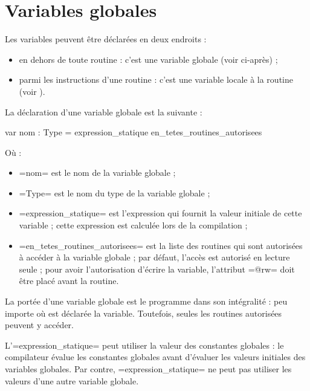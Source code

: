 




\chapter{Variables globales}

Les variables peuvent être déclarées en deux endroits :
\begin{itemize}
  \item en dehors de toute routine : c'est une variable globale (voir ci-après) ;
  \item parmi les instructions d'une routine : c'est une variable locale à la routine (voir ).
\end{itemize}






La déclaration d'une variable globale est la suivante :

\begin{PLM}
var nom : Type = expression_statique {
  en_tetes_routines_autorisees
}
\end{PLM}

Où :
\begin{itemize}
  \item \plm=nom= est le nom de la variable globale ;
  \item \plm=Type= est le nom du type de la variable globale ;
  \item \plm=expression_statique= est l'expression qui fournit la valeur initiale de cette variable ; cette expression est calculée lors de la compilation ;
  \item \plm=en_tetes_routines_autorisees= est la liste des routines qui sont autorisées à accéder à la variable globale ; par défaut, l'accès est autorisé en lecture seule ; pour avoir l'autorisation d'écrire la variable, l'attribut \plm=@rw= doit être placé avant la routine.
\end{itemize}

La portée d'une variable globale est le programme dans son intégralité : peu importe où est déclarée la variable. Toutefois, seules les routines autorisées peuvent y accéder.

L'\plm=expression_statique= peut utiliser la valeur des constantes globales : le compilateur évalue les constantes globales avant d'évaluer les valeurs initiales des variables globales. Par contre, \plm=expression_statique= ne peut pas utiliser les valeurs d'une autre variable globale.

